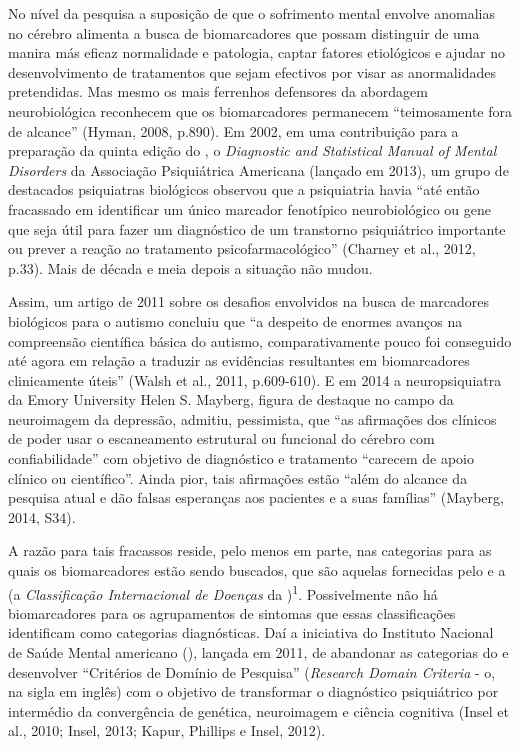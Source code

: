 No nível da pesquisa a suposição de que o sofrimento mental envolve
anomalias no cérebro alimenta a busca de biomarcadores que possam
distinguir de uma manira más eficaz normalidade e patologia, captar
fatores etiológicos e ajudar no desenvolvimento de tratamentos que sejam
efectivos por visar as anormalidades pretendidas. Mas mesmo os mais
ferrenhos defensores da abordagem neurobiológica reconhecem que os
biomarcadores permanecem ``teimosamente fora de alcance'' (Hyman, 2008,
p.890). Em 2002, em uma contribuição para a preparação da quinta edição
do , o \emph{Diagnostic and Statistical Manual of Mental Disorders}
da Associação Psiquiátrica Americana (lançado em 2013), um grupo de
destacados psiquiatras biológicos observou que a psiquiatria havia ``até
então fracassado em identificar um único marcador fenotípico
neurobiológico ou gene que seja útil para fazer um diagnóstico de um
transtorno psiquiátrico importante ou prever a reação ao tratamento
psicofarmacológico'' (Charney et al., 2012, p.33). Mais de década e meia
depois a situação não mudou.

Assim, um artigo de 2011 sobre os desafios envolvidos na busca de
marcadores biológicos para o autismo concluiu que ``a despeito de
enormes avanços na compreensão científica básica do autismo,
comparativamente pouco foi conseguido até agora em relação a traduzir as
evidências resultantes em biomarcadores clinicamente úteis'' (Walsh et
al., 2011, p.609-610). E em 2014 a neuropsiquiatra da Emory University
Helen S. Mayberg, figura de destaque no campo da neuroimagem da
depressão, admitiu, pessimista, que ``as afirmações dos clínicos de
poder usar o escaneamento estrutural ou funcional do cérebro com
confiabilidade'' com objetivo de diagnóstico e tratamento ``carecem de
apoio clínico ou científico''. Ainda pior, tais afirmações estão ``além
do alcance da pesquisa atual e dão falsas esperanças aos pacientes e a
suas famílias'' (Mayberg, 2014, S34).

A razão para tais fracassos reside, pelo menos em parte, nas categorias
para as quais os biomarcadores estão sendo buscados, que são aquelas
fornecidas pelo \emph{} e a \emph{} (a \emph{Classificação
Internacional de Doenças} da )\textsuperscript{1}. Possivelmente não
há biomarcadores para os agrupamentos de sintomas que essas
classificações identificam como categorias diagnósticas. Daí a
iniciativa do Instituto Nacional de Saúde Mental americano (),
lançada em 2011, de abandonar as categorias do  e desenvolver
``Critérios de Domínio de Pesquisa'' (\emph{Research Domain Criteria} -
o, na sigla em inglês) com o objetivo de transformar o diagnóstico
psiquiátrico por intermédio da convergência de genética, neuroimagem e
ciência cognitiva (Insel et al., 2010; Insel, 2013; Kapur, Phillips e
Insel, 2012).

